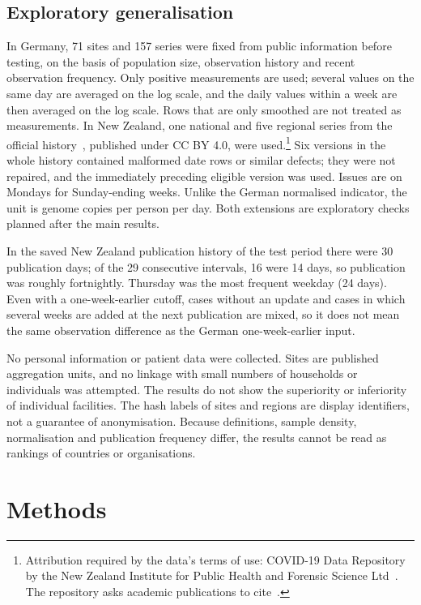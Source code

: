 \documentclass[11pt]{article}
\begin{document}
\subsection{Exploratory generalisation}

In Germany, 71 sites and 157 series were fixed from public information before testing, on the basis of population size, observation history and recent observation frequency. Only positive measurements are used; several values on the same day are averaged on the log scale, and the daily values within a week are then averaged on the log scale. Rows that are only smoothed are not treated as measurements. In New Zealand, one national and five regional series from the official history~\cite{nzdocs}, published under CC BY 4.0, were used.\footnote{Attribution required by the data's terms of use: COVID-19 Data Repository by the New Zealand Institute for Public Health and Forensic Science Ltd~\cite{nzdata}. The repository asks academic publications to cite~\cite{hewitt2022}.} Six versions in the whole history contained malformed date rows or similar defects; they were not repaired, and the immediately preceding eligible version was used. Issues are on Mondays for Sunday-ending weeks. Unlike the German normalised indicator, the unit is genome copies per person per day. Both extensions are exploratory checks planned after the main results.

In the saved New Zealand publication history of the test period there were 30 publication days; of the 29 consecutive intervals, 16 were 14 days, so publication was roughly fortnightly. Thursday was the most frequent weekday (24 days). Even with a one-week-earlier cutoff, cases without an update and cases in which several weeks are added at the next publication are mixed, so it does not mean the same observation difference as the German one-week-earlier input.

No personal information or patient data were collected. Sites are published aggregation units, and no linkage with small numbers of households or individuals was attempted. The results do not show the superiority or inferiority of individual facilities. The hash labels of sites and regions are display identifiers, not a guarantee of anonymisation. Because definitions, sample density, normalisation and publication frequency differ, the results cannot be read as rankings of countries or organisations.

\section{Methods}\label{sec:methods}
\end{document}
